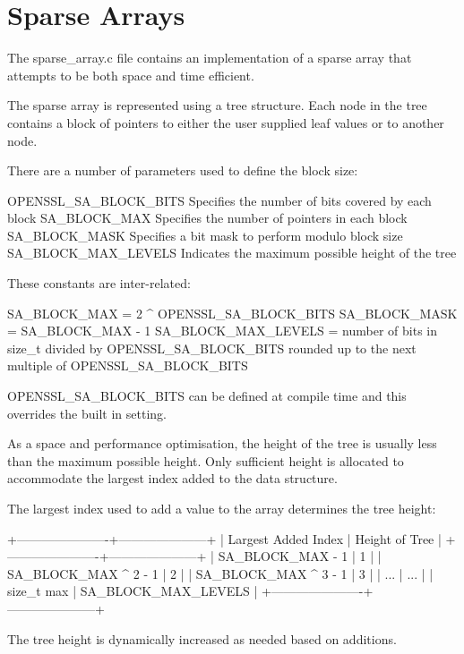 \chapter{Sparse Arrays}
\hypertarget{md__c_1_2_users_2namph_2_downloads_2openssl_2openssl-3_82_81_2crypto_2_r_e_a_d_m_e-sparse__array}{}\label{md__c_1_2_users_2namph_2_downloads_2openssl_2openssl-3_82_81_2crypto_2_r_e_a_d_m_e-sparse__array}
The {\ttfamily sparse\+\_\+array.\+c} file contains an implementation of a sparse array that attempts to be both space and time efficient.

The sparse array is represented using a tree structure. Each node in the tree contains a block of pointers to either the user supplied leaf values or to another node.

There are a number of parameters used to define the block size\+: \begin{DoxyVerb}OPENSSL_SA_BLOCK_BITS   Specifies the number of bits covered by each block
SA_BLOCK_MAX            Specifies the number of pointers in each block
SA_BLOCK_MASK           Specifies a bit mask to perform modulo block size
SA_BLOCK_MAX_LEVELS     Indicates the maximum possible height of the tree
\end{DoxyVerb}
 These constants are inter-\/related\+: \begin{DoxyVerb}SA_BLOCK_MAX        = 2 ^ OPENSSL_SA_BLOCK_BITS
SA_BLOCK_MASK       = SA_BLOCK_MAX - 1
SA_BLOCK_MAX_LEVELS = number of bits in size_t divided by
                      OPENSSL_SA_BLOCK_BITS rounded up to the next multiple
                      of OPENSSL_SA_BLOCK_BITS
\end{DoxyVerb}
 {\ttfamily OPENSSL\+\_\+\+SA\+\_\+\+BLOCK\+\_\+\+BITS} can be defined at compile time and this overrides the built in setting.

As a space and performance optimisation, the height of the tree is usually less than the maximum possible height. Only sufficient height is allocated to accommodate the largest index added to the data structure.

The largest index used to add a value to the array determines the tree height\+: \begin{DoxyVerb}    +----------------------+---------------------+
    | Largest Added Index  |   Height of Tree    |
    +----------------------+---------------------+
    | SA_BLOCK_MAX     - 1 |          1          |
    | SA_BLOCK_MAX ^ 2 - 1 |          2          |
    | SA_BLOCK_MAX ^ 3 - 1 |          3          |
    | ...                  |          ...        |
    | size_t max           | SA_BLOCK_MAX_LEVELS |
    +----------------------+---------------------+
\end{DoxyVerb}
 The tree height is dynamically increased as needed based on additions.

